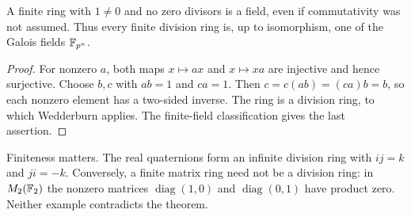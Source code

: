 \begin{corollary}
A finite ring with $1\ne0$ and no zero divisors is a field, even if
commutativity was not assumed. Thus every finite division ring is,
up to isomorphism, one of the Galois fields $\mathbb F_{p^n}$.
\end{corollary}
\begin{proof}
For nonzero $a$, both maps $x\mapsto ax$ and $x\mapsto xa$ are
injective and hence surjective. Choose $b,c$ with $ab=1$ and $ca=1$.
Then $c=c(ab)=(ca)b=b$, so each nonzero element has a two-sided inverse.
The ring is a division ring, to which Wedderburn applies. The finite-field
classification gives the last assertion.
\end{proof}

Finiteness matters. The real quaternions form an infinite division ring
with $ij=k$ and $ji=-k$. Conversely, a finite matrix ring need not be a
division ring: in $M_2(\mathbb F_2)$ the nonzero matrices
$\operatorname{diag}(1,0)$ and $\operatorname{diag}(0,1)$ have product zero.
Neither example contradicts the theorem.
